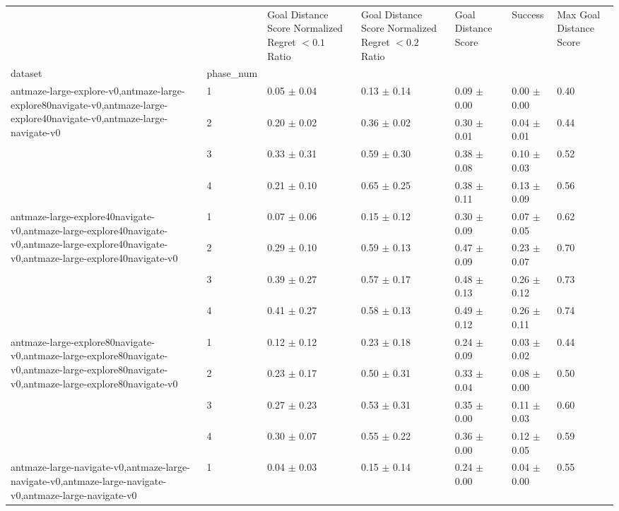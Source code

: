 \begin{tabular}{lllllll}
\toprule
 &  & Goal Distance Score Normalized Regret $< 0.1$ Ratio & Goal Distance Score Normalized Regret $< 0.2$ Ratio & Goal Distance Score & Success & Max Goal Distance Score \\
dataset & phase_num &  &  &  &  &  \\
\midrule
\multirow[t]{4}{*}{antmaze-large-explore-v0,antmaze-large-explore80navigate-v0,antmaze-large-explore40navigate-v0,antmaze-large-navigate-v0} & 1 & 0.05 $\pm$ 0.04 & 0.13 $\pm$ 0.14 & 0.09 $\pm$ 0.00 & 0.00 $\pm$ 0.00 & 0.40 \\
 & 2 & 0.20 $\pm$ 0.02 & 0.36 $\pm$ 0.02 & 0.30 $\pm$ 0.01 & 0.04 $\pm$ 0.01 & 0.44 \\
 & 3 & 0.33 $\pm$ 0.31 & 0.59 $\pm$ 0.30 & 0.38 $\pm$ 0.08 & 0.10 $\pm$ 0.03 & 0.52 \\
 & 4 & 0.21 $\pm$ 0.10 & 0.65 $\pm$ 0.25 & 0.38 $\pm$ 0.11 & 0.13 $\pm$ 0.09 & 0.56 \\
\cline{1-7}
\multirow[t]{4}{*}{antmaze-large-explore40navigate-v0,antmaze-large-explore40navigate-v0,antmaze-large-explore40navigate-v0,antmaze-large-explore40navigate-v0} & 1 & 0.07 $\pm$ 0.06 & 0.15 $\pm$ 0.12 & 0.30 $\pm$ 0.09 & 0.07 $\pm$ 0.05 & 0.62 \\
 & 2 & 0.29 $\pm$ 0.10 & 0.59 $\pm$ 0.13 & 0.47 $\pm$ 0.09 & 0.23 $\pm$ 0.07 & 0.70 \\
 & 3 & 0.39 $\pm$ 0.27 & 0.57 $\pm$ 0.17 & 0.48 $\pm$ 0.13 & 0.26 $\pm$ 0.12 & 0.73 \\
 & 4 & 0.41 $\pm$ 0.27 & 0.58 $\pm$ 0.13 & 0.49 $\pm$ 0.12 & 0.26 $\pm$ 0.11 & 0.74 \\
\cline{1-7}
\multirow[t]{4}{*}{antmaze-large-explore80navigate-v0,antmaze-large-explore80navigate-v0,antmaze-large-explore80navigate-v0,antmaze-large-explore80navigate-v0} & 1 & 0.12 $\pm$ 0.12 & 0.23 $\pm$ 0.18 & 0.24 $\pm$ 0.09 & 0.03 $\pm$ 0.02 & 0.44 \\
 & 2 & 0.23 $\pm$ 0.17 & 0.50 $\pm$ 0.31 & 0.33 $\pm$ 0.04 & 0.08 $\pm$ 0.00 & 0.50 \\
 & 3 & 0.27 $\pm$ 0.23 & 0.53 $\pm$ 0.31 & 0.35 $\pm$ 0.00 & 0.11 $\pm$ 0.03 & 0.60 \\
 & 4 & 0.30 $\pm$ 0.07 & 0.55 $\pm$ 0.22 & 0.36 $\pm$ 0.00 & 0.12 $\pm$ 0.05 & 0.59 \\
\cline{1-7}
\multirow[t]{4}{*}{antmaze-large-navigate-v0,antmaze-large-navigate-v0,antmaze-large-navigate-v0,antmaze-large-navigate-v0} & 1 & 0.04 $\pm$ 0.03 & 0.15 $\pm$ 0.14 & 0.24 $\pm$ 0.00 & 0.04 $\pm$ 0.00 & 0.55 \\

\end{tabular}
